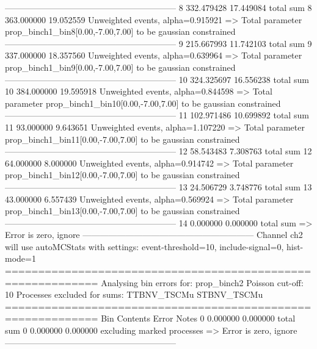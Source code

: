 ------------------------------------------------------------
8          332.479428      17.449084       total sum                     
8          363.000000      19.052559       Unweighted events, alpha=0.915921
  => Total parameter prop_binch1_bin8[0.00,-7.00,7.00] to be gaussian constrained
------------------------------------------------------------
9          215.667993      11.742103       total sum                     
9          337.000000      18.357560       Unweighted events, alpha=0.639964
  => Total parameter prop_binch1_bin9[0.00,-7.00,7.00] to be gaussian constrained
------------------------------------------------------------
10         324.325697      16.556238       total sum                     
10         384.000000      19.595918       Unweighted events, alpha=0.844598
  => Total parameter prop_binch1_bin10[0.00,-7.00,7.00] to be gaussian constrained
------------------------------------------------------------
11         102.971486      10.699892       total sum                     
11         93.000000       9.643651        Unweighted events, alpha=1.107220
  => Total parameter prop_binch1_bin11[0.00,-7.00,7.00] to be gaussian constrained
------------------------------------------------------------
12         58.543483       7.308763        total sum                     
12         64.000000       8.000000        Unweighted events, alpha=0.914742
  => Total parameter prop_binch1_bin12[0.00,-7.00,7.00] to be gaussian constrained
------------------------------------------------------------
13         24.506729       3.748776        total sum                     
13         43.000000       6.557439        Unweighted events, alpha=0.569924
  => Total parameter prop_binch1_bin13[0.00,-7.00,7.00] to be gaussian constrained
------------------------------------------------------------
14         0.000000        0.000000        total sum                     
  => Error is zero, ignore      
------------------------------------------------------------
Channel ch2 will use autoMCStats with settings: event-threshold=10, include-signal=0, hist-mode=1
============================================================
Analysing bin errors for: prop_binch2
Poisson cut-off: 10
Processes excluded for sums: TTBNV_TSCMu STBNV_TSCMu
============================================================
Bin        Contents        Error           Notes                         
0          0.000000        0.000000        total sum                     
0          0.000000        0.000000        excluding marked processes    
  => Error is zero, ignore      
------------------------------------------------------------

